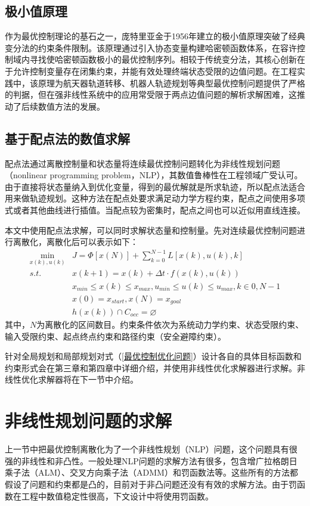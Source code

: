 \documentclass[master,academic]{ysuthesis} %
\begin{document}
	\subsection{极小值原理}
	作为最优控制理论的基石之一，庞特里亚金于1956年建立的极小值原理突破了经典变分法的约束条件限制。该原理通过引入协态变量构建哈密顿函数体系，在容许控制域内寻找使哈密顿函数极小的最优控制序列。相较于传统变分法，其核心创新在于允许控制变量存在闭集约束，并能有效处理终端状态受限的边值问题。在工程实践中，该原理为航天器轨道转移、机器人轨迹规划等典型最优控制问题提供了严格的判据，但在强非线性系统中的应用常受限于两点边值问题的解析求解困难，这推动了后续数值方法的发展。
	
	\subsection{基于配点法的数值求解}
	配点法通过离散控制量和状态量将连续最优控制问题转化为非线性规划问题（nonlinear programming problem，NLP），其数值鲁棒性在工程领域广受认可。由于直接将状态量纳入到优化变量，得到的最优解就是所求轨迹，所以配点法适合用来做轨迹规划。这种方法在配点处要求满足动力学方程约束，配点之间使用多项式或者其他曲线进行插值。当配点较为密集时，配点之间也可以近似用直线连接。

	本文中使用配点法求解，可以同时求解状态量和控制量。先对连续最优控制问题进行离散化，离散化后可以表示如下：
	\begin{equation}
	\begin{aligned}
		\min_{x(k),u(k)} &J = \Phi[x(N)]+\sum_{k=0}^{N-1}L[x(k),u(k),k]\\
			s.t. \ \ \ &x(k+1) = x(k)+ \Delta t \cdot f(x(k),u(k))\\
			&x_{min}\le x(k) \le x_{max},u_{min}\le u(k) \le u_{max},k \in{0,N-1}\\
			&x(0)=x_{start},x(N)=x_{goal}\\
			&h(x(k))\cap C_{occ}=\varnothing 
	\end{aligned}
	\label{最优控制优化问题}
	\end{equation}
	其中，$N$为离散化的区间数目。约束条件依次为系统动力学约束、状态受限约束、输入受限约束、起点终点约束和路径约束（安全避障约束）。

	针对全局规划和局部规划对式（\ref{最优控制优化问题}）设计各自的具体目标函数和约束形式会在第三章和第四章中详细介绍，并使用非线性优化求解器进行求解。非线性优化求解器将在下一节中介绍。

	\section{非线性规划问题的求解}
	上一节中把最优控制离散化为了一个非线性规划（NLP）问题，这个问题具有很强的非线性和非凸性。一般处理NLP问题的求解方法有很多，包含增广拉格朗日乘子法（ALM）、交叉方向乘子法（ADMM）和罚函数法等。这些所有的方法都假设了问题和约束都是凸的，目前对于非凸问题还没有有效的求解方法。由于罚函数在工程中数值稳定性很高，下文设计中将使用罚函数。
\end{document}
